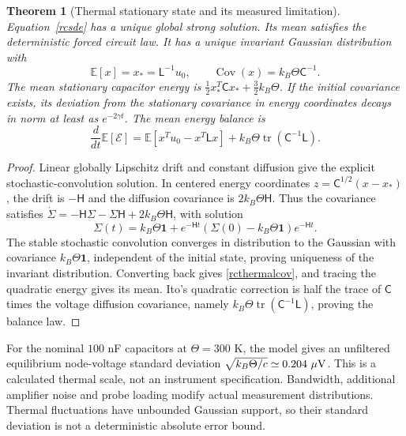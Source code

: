 \documentclass[11pt,letterpaper]{article}
\newcommand{\tr}{\operatorname{tr}}
\newcommand{\Id}{\mathbf 1}
\newtheorem{theorem}{Theorem}[section]
\theoremstyle{definition}
\numberwithin{equation}{section}
\begin{document}
\begin{theorem}[Thermal stationary state and its measured limitation]\label{rcthermal}
Equation~\eqref{rcsde} has a unique global strong solution. Its mean satisfies the deterministic forced circuit law. It has a unique invariant Gaussian distribution with
\begin{equation}\label{rcthermalcov}
\mathbb E[x]=x_*=\mathsf L^{-1}u_0,\qquad
\operatorname{Cov}(x)=k_B\Theta\mathsf C^{-1}.
\end{equation}
The mean stationary capacitor energy is $\tfrac12x_*^T\mathsf Cx_*+\tfrac32k_B\Theta$. If the initial covariance exists, its deviation from the stationary covariance in energy coordinates decays in norm at least as $e^{-2\gamma t}$. The mean energy balance is
\begin{equation}\label{rcthermalenergy}
\frac{d}{dt}\mathbb E[\mathcal E]
=\mathbb E[x^Tu_0-x^T\mathsf Lx]+k_B\Theta\tr(\mathsf C^{-1}\mathsf L).
\end{equation}
\end{theorem}
\begin{proof}
Linear globally Lipschitz drift and constant diffusion give the explicit stochastic-convolution solution. In centered energy coordinates $z=\mathsf C^{1/2}(x-x_*)$, the drift is $-\mathsf H$ and the diffusion covariance is $2k_B\Theta\mathsf H$. Thus the covariance satisfies $\dot\Sigma=-\mathsf H\Sigma-\Sigma\mathsf H+2k_B\Theta\mathsf H$, with solution
\begin{equation}\label{rcoucovsolution}
\Sigma(t)=k_B\Theta\Id+e^{-\mathsf Ht}(\Sigma(0)-k_B\Theta\Id)e^{-\mathsf Ht}.
\end{equation}
The stable stochastic convolution converges in distribution to the Gaussian with covariance $k_B\Theta\Id$, independent of the initial state, proving uniqueness of the invariant distribution. Converting back gives \eqref{rcthermalcov}, and tracing the quadratic energy gives its mean. Ito's quadratic correction is half the trace of $\mathsf C$ times the voltage diffusion covariance, namely $k_B\Theta\tr(\mathsf C^{-1}\mathsf L)$, proving the balance law.
\end{proof}
For the nominal $100$ nF capacitors at $\Theta=300$ K, the model gives an unfiltered equilibrium node-voltage standard deviation $\sqrt{k_B\Theta/c}\simeq0.204\ {\rm \mu V}$. This is a calculated thermal scale, not an instrument specification. Bandwidth, additional amplifier noise and probe loading modify actual measurement distributions. Thermal fluctuations have unbounded Gaussian support, so their standard deviation is not a deterministic absolute error bound.
\end{document}
